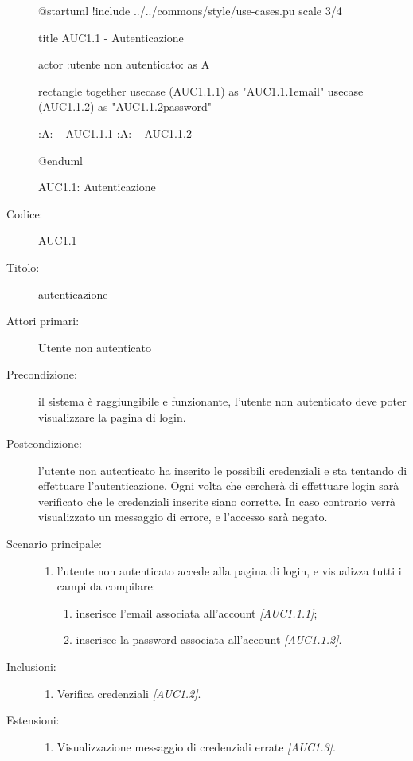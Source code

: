 \documentclass[casi-duso]{subfiles}
\begin{document}
\begin{figure}[h!] 
  \centering 
  \begin{plantuml}
  @startuml
  !include ../../commons/style/use-cases.pu
  scale 3/4

  title AUC1.1 - Autenticazione

  actor :utente non autenticato: as A

  rectangle {
    together {
    usecase (AUC1.1.1) as "AUC1.1.1\nInserimento email"
    usecase (AUC1.1.2) as "AUC1.1.2\nInserimento password"
    }
  }

  :A: -- AUC1.1.1
  :A: -- AUC1.1.2

  @enduml
  \end{plantuml} 
  \caption{AUC1.1: Autenticazione} 
  \label{fig:auc1_1} 
\end{figure}

\begin{description}
  \item[Codice:] AUC1.1
  \item[Titolo:] autenticazione
  \item[Attori primari:] Utente non autenticato
  \item[Precondizione:] il sistema è raggiungibile e funzionante, l'utente non autenticato deve poter visualizzare la pagina di login.
  \item[Postcondizione:] l'utente non autenticato ha inserito le possibili credenziali e sta tentando di effettuare l'autenticazione. Ogni volta che cercherà di effettuare
        login sarà verificato che le credenziali inserite siano corrette. In caso contrario verrà visualizzato un messaggio di errore, e l'accesso sarà negato.
  \item[Scenario principale:]
  \begin{enumerate}
    \item  l'utente non autenticato accede alla pagina di login, e visualizza tutti i campi da compilare:
    \begin{enumerate}
      \item inserisce l’email associata all’account \emph{[AUC1.1.1]};
      \item inserisce la password associata all’account \emph{[AUC1.1.2]}.
    \end{enumerate}
  \end{enumerate}
  \item[Inclusioni:]
  \begin{enumerate}
    \item Verifica credenziali \emph{[AUC1.2]}.
  \end{enumerate}
  \item[Estensioni:]
  \begin{enumerate}
    \item Visualizzazione messaggio di credenziali errate \emph{[AUC1.3]}.
  \end{enumerate}
\end{description}
\end{document}
